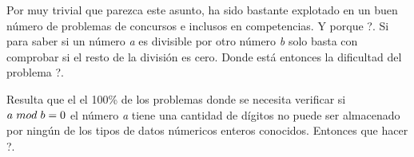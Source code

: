 Por muy trivial que parezca este asunto, ha sido bastante explotado en un buen número de problemas de concursos e inclusos en competencias. Y porque ?. Si para saber si un número {\em a} es divisible por otro número {\em b} solo basta con comprobar si el resto de la división es cero. Donde está entonces la dificultad del problema ?.

Resulta que el el 100\% de los problemas donde se necesita verificar si $a \hspace*{0.3em}mod \hspace*{0.3em} b = 0$ el número {\em a} tiene una cantidad de dígitos no puede ser almacenado por ningún de los tipos de datos númericos enteros conocidos. Entonces que hacer ?.